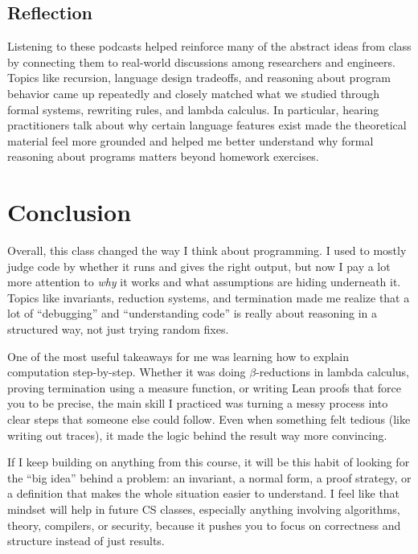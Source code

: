 \documentclass{article}
\theoremstyle{theorem}
\theoremstyle{definition}
\theoremstyle{remark}
\begin{document}
\subsection*{Reflection}

Listening to these podcasts helped reinforce many of the abstract ideas from class by connecting them to real-world discussions among researchers and engineers. Topics like recursion, language design tradeoffs, and reasoning about program behavior came up repeatedly and closely matched what we studied through formal systems, rewriting rules, and lambda calculus. In particular, hearing practitioners talk about why certain language features exist made the theoretical material feel more grounded and helped me better understand why formal reasoning about programs matters beyond homework exercises.


\section{Conclusion}\label{conclusion}

Overall, this class changed the way I think about programming. I used to mostly judge code by whether it runs and gives the right output, but now I pay a lot more attention to \emph{why} it works and what assumptions are hiding underneath it. Topics like invariants, reduction systems, and termination made me realize that a lot of “debugging” and “understanding code” is really about reasoning in a structured way, not just trying random fixes.

One of the most useful takeaways for me was learning how to explain computation step-by-step. Whether it was doing $\beta$-reductions in lambda calculus, proving termination using a measure function, or writing Lean proofs that force you to be precise, the main skill I practiced was turning a messy process into clear steps that someone else could follow. Even when something felt tedious (like writing out traces), it made the logic behind the result way more convincing.

If I keep building on anything from this course, it will be this habit of looking for the “big idea” behind a problem: an invariant, a normal form, a proof strategy, or a definition that makes the whole situation easier to understand. I feel like that mindset will help in future CS classes, especially anything involving algorithms, theory, compilers, or security, because it pushes you to focus on correctness and structure instead of just results.
\end{document}
